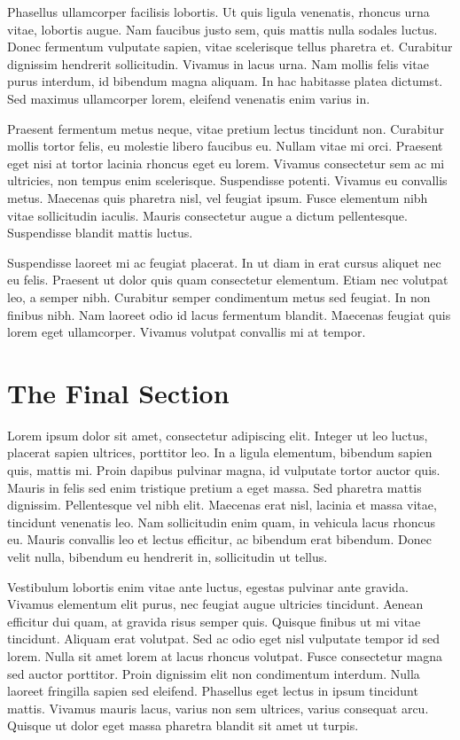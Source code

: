 Phasellus ullamcorper facilisis lobortis. Ut quis ligula venenatis, rhoncus urna vitae, lobortis augue. Nam faucibus justo sem, quis mattis nulla sodales luctus. Donec fermentum vulputate sapien, vitae scelerisque tellus pharetra et. Curabitur dignissim hendrerit sollicitudin. Vivamus in lacus urna. Nam mollis felis vitae purus interdum, id bibendum magna aliquam. In hac habitasse platea dictumst. Sed maximus ullamcorper lorem, eleifend venenatis enim varius in.

Praesent fermentum metus neque, vitae pretium lectus tincidunt non. Curabitur mollis tortor felis, eu molestie libero faucibus eu. Nullam vitae mi orci. Praesent eget nisi at tortor lacinia rhoncus eget eu lorem. Vivamus consectetur sem ac mi ultricies, non tempus enim scelerisque. Suspendisse potenti. Vivamus eu convallis metus. Maecenas quis pharetra nisl, vel feugiat ipsum. Fusce elementum nibh vitae sollicitudin iaculis. Mauris consectetur augue a dictum pellentesque. Suspendisse blandit mattis luctus.

Suspendisse laoreet mi ac feugiat placerat. In ut diam in erat cursus aliquet nec eu felis. Praesent ut dolor quis quam consectetur elementum. Etiam nec volutpat leo, a semper nibh. Curabitur semper condimentum metus sed feugiat. In non finibus nibh. Nam laoreet odio id lacus fermentum blandit. Maecenas feugiat quis lorem eget ullamcorper. Vivamus volutpat convallis mi at tempor.

\section{The Final Section}
Lorem ipsum dolor sit amet, consectetur adipiscing elit. Integer ut leo luctus, placerat sapien ultrices, porttitor leo. In a ligula elementum, bibendum sapien quis, mattis mi. Proin dapibus pulvinar magna, id vulputate tortor auctor quis. Mauris in felis sed enim tristique pretium a eget massa. Sed pharetra mattis dignissim. Pellentesque vel nibh elit. Maecenas erat nisl, lacinia et massa vitae, tincidunt venenatis leo. Nam sollicitudin enim quam, in vehicula lacus rhoncus eu. Mauris convallis leo et lectus efficitur, ac bibendum erat bibendum. Donec velit nulla, bibendum eu hendrerit in, sollicitudin ut tellus.

Vestibulum lobortis enim vitae ante luctus, egestas pulvinar ante gravida. Vivamus elementum elit purus, nec feugiat augue ultricies tincidunt. Aenean efficitur dui quam, at gravida risus semper quis. Quisque finibus ut mi vitae tincidunt. Aliquam erat volutpat. Sed ac odio eget nisl vulputate tempor id sed lorem. Nulla sit amet lorem at lacus rhoncus volutpat. Fusce consectetur magna sed auctor porttitor. Proin dignissim elit non condimentum interdum. Nulla laoreet fringilla sapien sed eleifend. Phasellus eget lectus in ipsum tincidunt mattis. Vivamus mauris lacus, varius non sem ultrices, varius consequat arcu. Quisque ut dolor eget massa pharetra blandit sit amet ut turpis.

